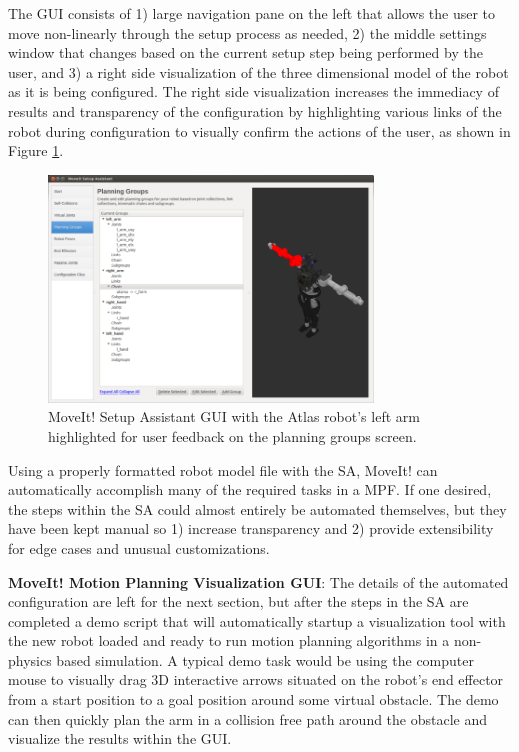 \documentclass[10pt,journal,compsoc]{joser1}
\begin{document}
{The GUI consists of 1) large navigation pane on the left that allows the user to move non-linearly through the setup process as needed, 2) the middle settings window that changes based on the current setup step being performed by the user, and 3) a right side visualization of the three dimensional model of the robot as it is being configured. The right side visualization increases the immediacy of results and transparency of the configuration by highlighting various links of the robot during configuration to visually confirm the actions of the user, as shown in Figure \ref{fig:setupassistant3}.

\begin{figure}[!t]
\centering
\includegraphics[width=3.4in]{images/setup_assistant3}
\caption{MoveIt! Setup Assistant GUI with the Atlas robot's left arm highlighted for user feedback on the planning groups screen.}
\label{fig:setupassistant3}	
\end{figure}

Using a properly formatted robot model file with the SA, MoveIt! can automatically accomplish many of the required tasks in a MPF. If one desired, the steps within the SA could almost entirely be automated themselves, but they have been kept manual so 1) increase transparency and 2) provide extensibility for edge cases and unusual customizations.

{\bf MoveIt! Motion Planning Visualization GUI}: The details of the automated configuration are left for the next section, but after the steps in the SA are completed a demo script that will automatically startup a visualization tool with the new robot loaded and ready to run motion planning algorithms in a non-physics based simulation. A typical demo task would be using the computer mouse to visually drag 3D interactive arrows situated on the robot's end effector from a start position to a goal position around some virtual obstacle. The demo can then quickly plan the arm in a collision free path around the obstacle and visualize the results within the GUI. 

}
\end{document}
